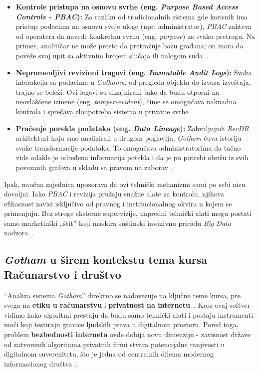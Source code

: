 ﻿\documentclass[12pt]{article}
\begin{document}
\begin{itemize}
    \item \textbf{Kontrole pristupa na osnovu svrhe (eng. \textit{Purpose Based Access Controls - PBAC}):} Za razliku od tradicionalnih sistema gde korisnik ima pristup podacima na osnovu svoje uloge (npr. administrator), \textit{PBAC} zahteva od operatera da navede konkretnu svrhu (eng. \textit{purpose}) za svaku pretragu.
    Na primer, analitičar ne može prosto da pretražuje bazu građana; on mora da poveže svoj upit sa aktivnim brojem slučaja ili nalogom suda~\cite{architecture2024, palantir2024privacy}.
    \item \textbf{Nepromenljivi revizioni tragovi (eng. \textit{Immutable Audit Logs}):} Svaka interakcija sa podacima u \textit{Gothamu}, od pregleda objekta do izvoza izveštaja, trajno se beleži.
    Ovi logovi su dizajnirani tako da budu otporni na neovlašćene izmene (eng. \textit{tamper-evident}), čime se omogućava naknadna kontrola i sprečava zloupotreba sistema u privatne svrhe~\cite{palantir2024gotham, architecture2024}.
    \item \textbf{Praćenje porekla podataka (eng. \textit{Data Lineage}):} Zahvaljujući \textit{RevDB} arhitekturi koju smo analizirali u drugom poglavlju, \textit{Gotham} čuva istoriju svake transformacije podataka.
To omogućava administratorima da tačno vide odakle je određena informacija potekla i da je po potrebi obrišu iz svih povezanih grafova u skladu sa pravom na zaborav~\cite{architecture2024, palantir2024privacy}.
\end{itemize}

Ipak, naučna zajednica upozorava da ovi tehnički mehanizmi sami po sebi nisu dovoljni.
Iako \textit{PBAC} i revizija pružaju snažne alate za kontrolu, njihova efikasnost zavisi isključivo od pravnog i institucionalnog okvira u kojem se primenjuju.
Bez stroge eksterne supervizije, napredni tehnički alati mogu postati samo marketinški „štit” koji maskira suštinski invazivnu prirodu \textit{Big Data} nadzora~\cite{ulbricht2024palantir}.


\subsection{\textit{Gotham} u širem kontekstu tema kursa Računarstvo i društvo}
\enquote{Analiza sistema \textit{Gotham}} direktno se nadovezuje na ključne teme kursa, pre svega na \textbf{etiku u računarstvu} i \textbf{privatnost na internetu}~\cite{ulbricht2024palantir}. 
Kroz ovaj softver vidimo kako algoritmi prestaju da budu samo tehnički alati i postaju instrumenti moći koji testiraju granice ljudskih prava u digitalnom prostoru. Pored toga, problem \textbf{bezbednosti interneta} ovde dobija novu dimenziju - zavisnost države od zatvorenih algoritama privatnih firmi stvara potencijalne ranjivosti u digitalnom suverenitetu, što je jedna od centralnih dilema modernog informacionog društva~\cite{carnegie2024private}.
\end{document}
